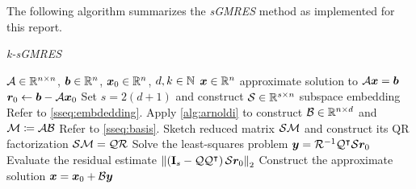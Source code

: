 The following algorithm summarizes the \textit{sGMRES} method as implemented for this report.

\begin{algorithm}
\caption{\textit{k-sGMRES}} \label{alg:sgmres}
\begin{algorithmic}
\Require $\mathcal{A} \in \mathbb{R}^{n \times n}$, $\bm{b} \in \mathbb{R}^{n}$, $\bm{x}_0 \in \mathbb{R}^{n}$, $d, k \in \mathbb{N}$
\Ensure $\bm{x} \in \mathbb{R}^{n}$ approximate solution to $\mathcal{A} \bm{x} = \bm{b}$
\State $\bm{r}_0 \gets \bm{b} - \mathcal{A} \bm{x}_0$
\State Set $s = 2 (d + 1)$ and construct $\mathcal{S} \in \mathbb{R}^{s \times n}$ subspace embedding \Comment Refer to \cref{sseq:embdedding}.
\State Apply \cref{alg:arnoldi} to construct $\mathcal{B} \in \mathbb{R}^{n \times d}$ and $\mathcal{M} \coloneqq \mathcal{A} \mathcal{B}$ \Comment Refer to \cref{sseq:basis}.
\State Sketch reduced matrix $\mathcal{S} \mathcal{M}$ and construct its QR factorization $\mathcal{S} \mathcal{M} = \mathcal{Q} \mathcal{R}$
\State Solve the least-squares problem $\bm{y} = \mathcal{R}^{-1} \mathcal{Q}^{\intercal} \mathcal{S} \bm{r}_0$
\State Evaluate the residual estimate $\left\lVert  \left( \mathbf{I}_s - \mathcal{Q} \mathcal{Q}^{\intercal} \right) \mathcal{S} \bm{r}_0  \right\rVert_2$
\State Construct the approximate solution $\bm{x} = \bm{x}_0 + \mathcal{B} \bm{y}$
\end{algorithmic}
\end{algorithm}
